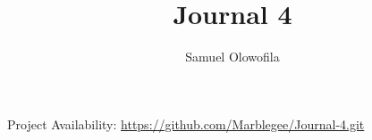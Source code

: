 \documentclass[12pt]{article}
\begin{document}
\title{Journal 4}
\author{Samuel Olowofila} 
\date{}
\maketitle

Project Availability: \url{https://github.com/Marblegee/Journal-4.git}


\clearpage




\end{document}

